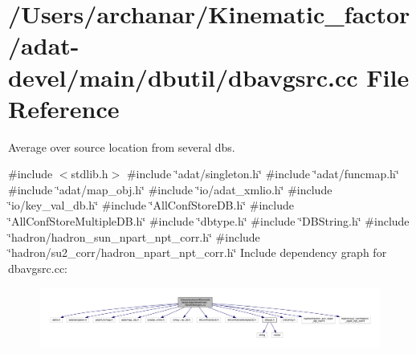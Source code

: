 \hypertarget{adat-devel_2main_2dbutil_2dbavgsrc_8cc}{}\section{/\+Users/archanar/\+Kinematic\+\_\+factor/adat-\/devel/main/dbutil/dbavgsrc.cc File Reference}
\label{adat-devel_2main_2dbutil_2dbavgsrc_8cc}


Average over source location from several dbs.  


{\ttfamily \#include $<$stdlib.\+h$>$}\newline
{\ttfamily \#include \char`\"{}adat/singleton.\+h\char`\"{}}\newline
{\ttfamily \#include \char`\"{}adat/funcmap.\+h\char`\"{}}\newline
{\ttfamily \#include \char`\"{}adat/map\+\_\+obj.\+h\char`\"{}}\newline
{\ttfamily \#include \char`\"{}io/adat\+\_\+xmlio.\+h\char`\"{}}\newline
{\ttfamily \#include \char`\"{}io/key\+\_\+val\+\_\+db.\+h\char`\"{}}\newline
{\ttfamily \#include \char`\"{}All\+Conf\+Store\+D\+B.\+h\char`\"{}}\newline
{\ttfamily \#include \char`\"{}All\+Conf\+Store\+Multiple\+D\+B.\+h\char`\"{}}\newline
{\ttfamily \#include \char`\"{}dbtype.\+h\char`\"{}}\newline
{\ttfamily \#include \char`\"{}D\+B\+String.\+h\char`\"{}}\newline
{\ttfamily \#include \char`\"{}hadron/hadron\+\_\+sun\+\_\+npart\+\_\+npt\+\_\+corr.\+h\char`\"{}}\newline
{\ttfamily \#include \char`\"{}hadron/su2\+\_\+corr/hadron\+\_\+npart\+\_\+npt\+\_\+corr.\+h\char`\"{}}\newline
Include dependency graph for dbavgsrc.\+cc\+:
\nopagebreak
\begin{figure}[H]
\begin{center}
\leavevmode
\includegraphics[width=350pt]{d2/d03/adat-devel_2main_2dbutil_2dbavgsrc_8cc__incl}
\end{center}
\end{figure}
